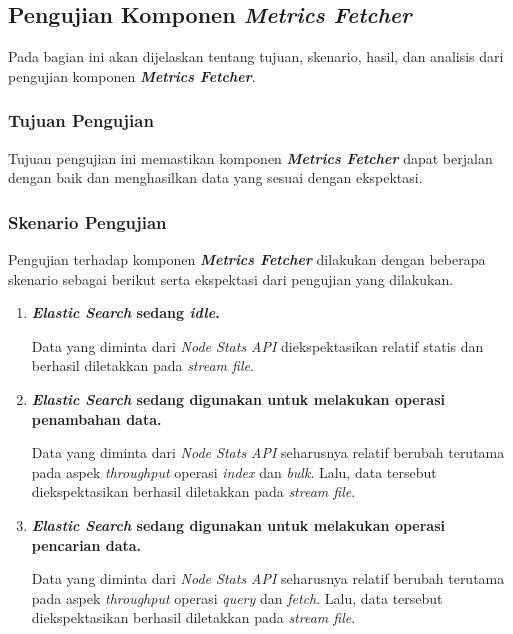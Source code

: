 \subsection{Pengujian Komponen \textit{Metrics Fetcher}}

Pada bagian ini akan dijelaskan tentang tujuan, skenario, hasil, dan analisis dari pengujian komponen \textbf{\textit{Metrics Fetcher}}.

\subsubsection{Tujuan Pengujian}

Tujuan pengujian ini memastikan komponen \textbf{\textit{Metrics Fetcher}} dapat berjalan dengan baik dan menghasilkan data yang sesuai dengan ekspektasi.

\subsubsection{Skenario Pengujian}

Pengujian terhadap komponen \textbf{\textit{Metrics Fetcher}} dilakukan dengan beberapa skenario sebagai berikut serta ekspektasi dari pengujian yang dilakukan.
\begin{enumerate}
  \item \bfseries\textit{Elastic Search} sedang \textit{idle}.\normalfont

        Data yang diminta dari \textit{Node Stats API} diekspektasikan relatif statis dan berhasil diletakkan pada \textit{stream file}.
  \item \bfseries\textit{Elastic Search} sedang digunakan untuk melakukan operasi penambahan data.\normalfont

        Data yang diminta dari \textit{Node Stats API} seharusnya relatif berubah terutama pada aspek \textit{throughput} operasi \textit{index} dan \textit{bulk}. Lalu, data tersebut diekspektasikan berhasil diletakkan pada \textit{stream file}.

  \item \bfseries\textit{Elastic Search} sedang digunakan untuk melakukan operasi pencarian data.\normalfont

        Data yang diminta dari \textit{Node Stats API} seharusnya relatif berubah terutama pada aspek \textit{throughput} operasi \textit{query} dan \textit{fetch}. Lalu, data tersebut diekspektasikan berhasil diletakkan pada \textit{stream file}.
\end{enumerate}

